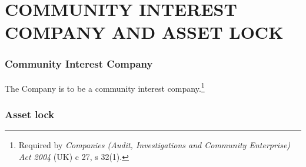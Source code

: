 \documentclass[a4paper,12pt]{article}
\begin{document}
\part*{COMMUNITY INTEREST COMPANY AND ASSET LOCK}

\section{Community Interest Company}

{\color{red}The Company is to be a community interest company.}\footnote{Required by \textit{Companies (Audit, Investigations and Community Enterprise) Act 2004} (UK) c 27, s 32(1).}

\section{Asset lock}
\end{document}
